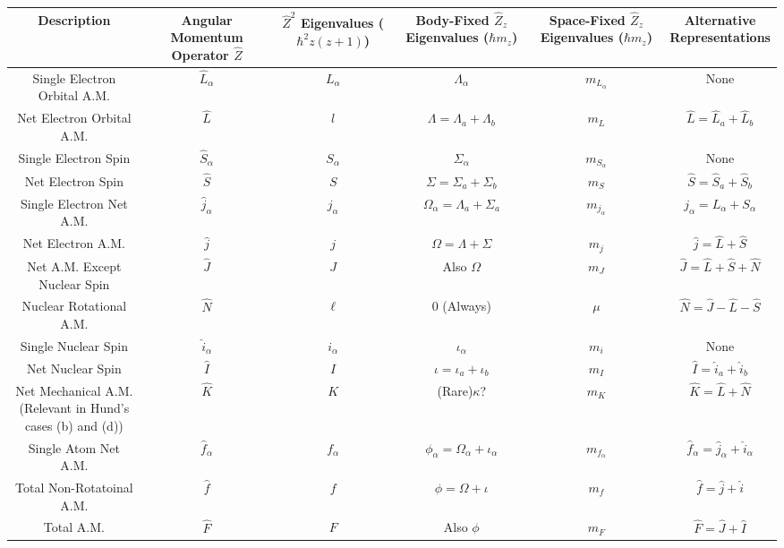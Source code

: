 \documentclass[prl, longbibliography]{revtex4-2}
\begin{document}
\begin{center}
\begin{tabular}{ ||c|c|c|c|c|c||  }
 \hline
 Description & \makecell{Angular \\Momentum \\Operator $\hat{Z}$} & \makecell{$\hat{Z}^2$ Eigenvalues \\($\hbar^2 z(z+1)$)} & \makecell{Body-Fixed\\ $\hat{Z}_z$ Eigenvalues \\($\hbar m_z$)} &\makecell{Space-Fixed\\ $\hat{Z}_z$ Eigenvalues \\($\hbar m_z$)} & \makecell{Alternative \\Representations}\\
 \hline
 \hline
 Single Electron Orbital A.M. & $\hat{L}_\alpha$ & $L_\alpha$ & $\Lambda_\alpha$ & $m_{L_\alpha} $ & None \\
 \hline
 Net Electron Orbital A.M. & $\hat{L}$ & $l$ & $\Lambda=\Lambda_a+\Lambda_b$ &$m_L $ & $\hat{L}=\hat{L}_a + \hat{L}_b$ \\
 \hline
 Single Electron Spin & $\hat{S}_\alpha$ & $S_\alpha$ & $\Sigma_\alpha$ &$m_{S_\alpha} $ & None \\
 \hline
 Net Electron Spin & $\hat{S}$ & $S$ & $\Sigma=\Sigma_a+\Sigma_b$ &$m_S $ &  $\hat{S}=\hat{S}_a + \hat{S}_b$ \\
 \hline
 Single Electron Net A.M. & $\hat{j}_\alpha$ & $j_\alpha$ & $\Omega_\alpha=\Lambda_a+\Sigma_a$ &$m_{j_\alpha} $ &  $j_\alpha = L_\alpha+S_\alpha$ \\
 \hline
 Net Electron A.M. & $\hat{j}$ & $j$ & $\Omega=\Lambda+\Sigma$ &$m_j $  & $\hat{j} = \hat{L}+\hat{S}$ \\
 \hline
 Net A.M. Except Nuclear Spin & $\hat{J}$ & $J$ & Also $\Omega$ &$m_J $  & $\hat{J}=\hat{L}+\hat{S}+\hat{N}$ \\
 \hline
 Nuclear Rotational A.M. & $\hat{N}$ & $\ell$ & $0$ (Always) & $\mu$ &  $\hat{N} = \hat{J} - \hat{L} - \hat{S}$ \\
 \hline
 Single Nuclear Spin & $\hat{i}_\alpha$ & $i_\alpha$ & $\iota_{\alpha}$ &$m_i $ &  None \\
 \hline
 Net Nuclear Spin & $\hat{I}$ & $I$ & $\iota=\iota_a+\iota_b$ &$m_I $ &  $\hat{I}=\hat{i}_a+\hat{i}_b$ \\
 \hline
 \makecell{Net Mechanical A.M.\\(Relevant in Hund's cases (b) and (d))} & $\hat{K}$ & $K$ & (Rare)$\kappa$? &$m_K $ &  $\hat{K}=\hat{L}+\hat{N}$ \\
 \hline
  Single Atom Net A.M. & $\hat{f}_\alpha$ & $f_\alpha$ & $\phi_\alpha=\Omega_\alpha+\iota_{\alpha}$ &  $m_{f_\alpha} $& $\hat{f}_\alpha=\hat{j}_\alpha+\hat{i}_\alpha$ \\
 \hline
   Total Non-Rotatoinal A.M. & $\hat{f}$ & $f$ & $\phi=\Omega+\iota$ &  $m_f $& $\hat{f}=\hat{j}+\hat{i}$ \\
 \hline
  Total A.M. & $\hat{F}$ & $F$ & Also $\phi$ &$m_F $ &  $\hat{F}=\hat{J}+\hat{I}$ \\
 \hline 
\end{tabular}
\end{center}
\end{document}
